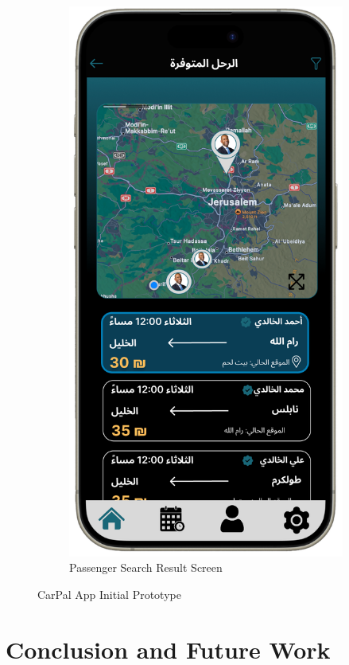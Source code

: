 \documentclass[a4paper, 12pt]{article} %
\begin{document}
\begin{figure}[h]
\begin{subfigure}{0.3\textwidth}
                    \includegraphics[width=0.8\linewidth, height=0.9\textheight, keepaspectratio]{Images/App_Desgin_Trip_List.png}
                    \caption{Passenger Search Result Screen}
                    \label{fig:our_results}
                \end{subfigure}
                \caption{CarPal App Initial Prototype\protect \footnotemark[1]}
                \label{fig:our_gallary}
        \end{figure}

    \pagebreak
    \section{Conclusion and Future Work}
\end{document}
